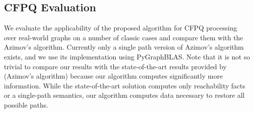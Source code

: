 

\subsection{CFPQ Evaluation}

We evaluate the applicability of the proposed algorithm for CFPQ processing over real-world graphs on a number of classic cases and compare them with the Azimov's algorithm.
Currently only a single path version of Azimov's algorithm exists, and we use its implementation using PyGraphBLAS. Note that it is not so trivial to compare our results with the state-of-the-art results provided by~\cite{10.1145/3398682.3399163} (Azimov's algorithm) because our algorithm computes significantly more information. While the state-of-the-art solution computes only reachability facts or a single-path semantics, our algorithm computes data necessary to restore all possible paths.

